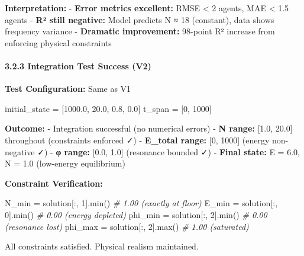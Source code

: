 \documentclass[
]{article}
\newenvironment{Shaded}{}{}
\newcommand{\BuiltInTok}[1]{\textcolor[rgb]{0.00,0.50,0.00}{#1}}
\newcommand{\CommentTok}[1]{\textcolor[rgb]{0.38,0.63,0.69}{\textit{#1}}}
\newcommand{\DecValTok}[1]{\textcolor[rgb]{0.25,0.63,0.44}{#1}}
\newcommand{\FloatTok}[1]{\textcolor[rgb]{0.25,0.63,0.44}{#1}}
\newcommand{\NormalTok}[1]{#1}
\newcommand{\OperatorTok}[1]{\textcolor[rgb]{0.40,0.40,0.40}{#1}}
\begin{document}
\textbf{Interpretation:} - \textbf{Error metrics excellent:} RMSE
\textless{} 2 agents, MAE \textless{} 1.5 agents - \textbf{R² still
negative:} Model predicts N ≈ 18 (constant), data shows frequency
variance - \textbf{Dramatic improvement:} 98-point R² increase from
enforcing physical constraints

\paragraph{3.2.3 Integration Test Success
(V2)}\label{integration-test-success-v2}

\textbf{Test Configuration:} Same as V1

\begin{Shaded}
\begin{Highlighting}[]
\NormalTok{initial\_state }\OperatorTok{=}\NormalTok{ [}\FloatTok{1000.0}\NormalTok{, }\FloatTok{20.0}\NormalTok{, }\FloatTok{0.8}\NormalTok{, }\FloatTok{0.0}\NormalTok{]}
\NormalTok{t\_span }\OperatorTok{=}\NormalTok{ [}\DecValTok{0}\NormalTok{, }\DecValTok{1000}\NormalTok{]}
\end{Highlighting}
\end{Shaded}

\textbf{Outcome:} - Integration successful (no numerical errors) -
\textbf{N range:} {[}1.0, 20.0{]} throughout (constraints enforced ✓) -
\textbf{E\_total range:} {[}0, 1000{]} (energy non-negative ✓) -
\textbf{φ range:} {[}0.0, 1.0{]} (resonance bounded ✓) - \textbf{Final
state:} E = 6.0, N = 1.0 (low-energy equilibrium)

\textbf{Constraint Verification:}

\begin{Shaded}
\begin{Highlighting}[]
\NormalTok{N\_min }\OperatorTok{=}\NormalTok{ solution[:, }\DecValTok{1}\NormalTok{].}\BuiltInTok{min}\NormalTok{()  }\CommentTok{\# 1.00 (exactly at floor)}
\NormalTok{E\_min }\OperatorTok{=}\NormalTok{ solution[:, }\DecValTok{0}\NormalTok{].}\BuiltInTok{min}\NormalTok{()  }\CommentTok{\# 0.00 (energy depleted)}
\NormalTok{phi\_min }\OperatorTok{=}\NormalTok{ solution[:, }\DecValTok{2}\NormalTok{].}\BuiltInTok{min}\NormalTok{()  }\CommentTok{\# 0.00 (resonance lost)}
\NormalTok{phi\_max }\OperatorTok{=}\NormalTok{ solution[:, }\DecValTok{2}\NormalTok{].}\BuiltInTok{max}\NormalTok{()  }\CommentTok{\# 1.00 (saturated)}
\end{Highlighting}
\end{Shaded}

All constraints satisfied. Physical realism maintained.
\end{document}
